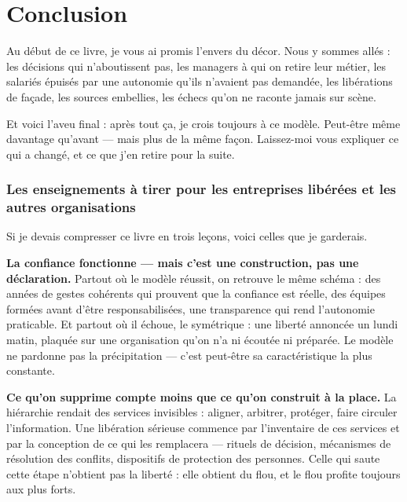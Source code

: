 \part*{Conclusion}

Au début de ce livre, je vous ai promis l'envers du décor. Nous y sommes allés : les décisions qui n'aboutissent pas, les managers à qui on retire leur métier, les salariés épuisés par une autonomie qu'ils n'avaient pas demandée, les libérations de façade, les sources embellies, les échecs qu'on ne raconte jamais sur scène.

Et voici l'aveu final : après tout ça, je crois toujours à ce modèle. Peut-être même davantage qu'avant — mais plus de la même façon. Laissez-moi vous expliquer ce qui a changé, et ce que j'en retire pour la suite.

\section*{Les enseignements à tirer pour les entreprises libérées et les autres organisations}

Si je devais compresser ce livre en trois leçons, voici celles que je garderais.

\textbf{La confiance fonctionne — mais c'est une construction, pas une déclaration.} Partout où le modèle réussit, on retrouve le même schéma : des années de gestes cohérents qui prouvent que la confiance est réelle, des équipes formées avant d'être responsabilisées, une transparence qui rend l'autonomie praticable. Et partout où il échoue, le symétrique : une liberté annoncée un lundi matin, plaquée sur une organisation qu'on n'a ni écoutée ni préparée. Le modèle ne pardonne pas la précipitation — c'est peut-être sa caractéristique la plus constante.

\textbf{Ce qu'on supprime compte moins que ce qu'on construit à la place.} La hiérarchie rendait des services invisibles : aligner, arbitrer, protéger, faire circuler l'information. Une libération sérieuse commence par l'inventaire de ces services et par la conception de ce qui les remplacera — rituels de décision, mécanismes de résolution des conflits, dispositifs de protection des personnes. Celle qui saute cette étape n'obtient pas la liberté : elle obtient du flou, et le flou profite toujours aux plus forts.

